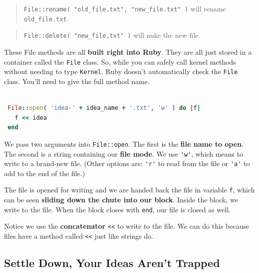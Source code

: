 \documentclass[10pt,twoside]{report}
\begin{document}
\begin{quote}
\lstinline[breaklines=true]|File::rename( "old_file.txt", "new_file.txt" )| 
will rename
\lstinline[breaklines=true]|old_file.txt|.\end{quote}


\begin{quote}
\lstinline[breaklines=true]|File::delete( "new_file.txt" )| will nuke
the new file.\end{quote}


These File methods are all {\bf built right into Ruby}.  They are all
just stored in a container called the
\lstinline[breaklines=true]|File| class.  So, while you can safely
call kernel methods without needing to type
\lstinline[breaklines=true]|Kernel|, Ruby doesn't automatically check
the \lstinline[breaklines=true]|File| class. You'll need to give the
full method name.


\begin{lstlisting}[basicstyle=\ttfamily\color{basiccolor},
    commentstyle = \ttfamily\color{commentcolor},
    keywordstyle=\ttfamily\color{keywordscolor},
    stringstyle=\color{stringcolor},
    language=Ruby,
    basicstyle=\small\ttfamily,
    showstringspaces=false,
  ]

 File::open( 'idea-' + idea_name + '.txt', 'w' ) do |f|
   f << idea
 end

\end{lstlisting}

We pass two arguments into \lstinline[breaklines=true]|File::open|.
The first is the {\bf file name to open}.  The second is a string
containing our {\bf file mode}.  We use
\lstinline[breaklines=true]|'w'|, which means to write to a brand-new
file.  (Other options are: \lstinline[breaklines=true]|'r'| to read
from the file or \lstinline[breaklines=true]|'a'| to add to the end of
the file.)

The file is opened for writing and we are handed back the file in
variable \lstinline[breaklines=true]|f|, which can be seen {\bf
  sliding down the chute into our block}.  Inside the block, we write
to the file.  When the block closes with
\lstinline[breaklines=true]|end|, our file is closed as well.

Notice we use the {\bf concatenator} \lstinline[breaklines=true]|<<|
to write to the file.  We can do this because files have a method
called \lstinline[breaklines=true]|<<| just like strings do.



\subsection{Settle Down, Your Ideas Aren't Trapped}
\end{document}
